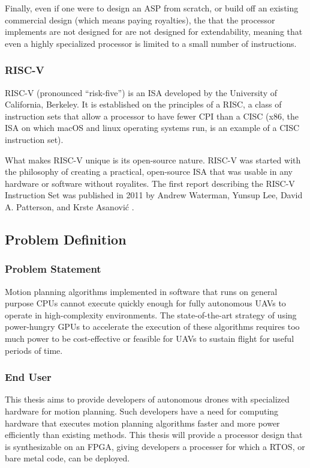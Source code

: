         Finally, even if one were to design an \gls{ASP} from scratch, or build off an existing commercial design (which means paying royalties), the  that the processor implements are not designed for are not designed for extendability, meaning that even a highly specialized processor is limited to a small number of instructions.


    \subsubsection{RISC-V}
        RISC-V (pronounced ``risk-five'') is an \gls{ISA} developed by the University of California, Berkeley. It is established on the principles of a \gls{RISC}, a class of instruction sets that allow a processor to have fewer \gls{CPI} than a \gls{CISC} (x86, the \gls{ISA} on which macOS and linux operating systems run, is an example of a \gls{CISC} instruction set). 

        What makes RISC-V unique is its open-source nature. RISC-V was started with the philosophy of creating a practical, open-source \gls{ISA} that was usable in any hardware or software without royalites. The first report describing the RISC-V Instruction Set was published in 2011 by Andrew Waterman, Yunsup Lee, David A. Patterson, and Krste Asanović \cite{Isa2012}.
    

\newpage
\subsection{Problem Definition}

    \subsubsection*{Problem Statement}
    Motion planning algorithms implemented in software that runs on general purpose \gls{CPU}s cannot execute quickly enough for fully autonomous \gls{UAV}s to operate in high-complexity environments. The state-of-the-art strategy of using power-hungry \gls{GPU}s to accelerate the execution of these algorithms requires too much power to be cost-effective or feasible for \gls{UAV}s to sustain flight for useful periods of time. 

    \subsubsection*{End User}
    This thesis aims to provide developers of autonomous drones with specialized hardware for motion planning. Such developers have a need for computing hardware that executes motion planning algorithms faster and more power efficiently than existing methods. This thesis will provide a processor design that is synthesizable on an \gls{FPGA}, giving developers a processer for which a \gls{RTOS}, or bare metal code, can be deployed.
